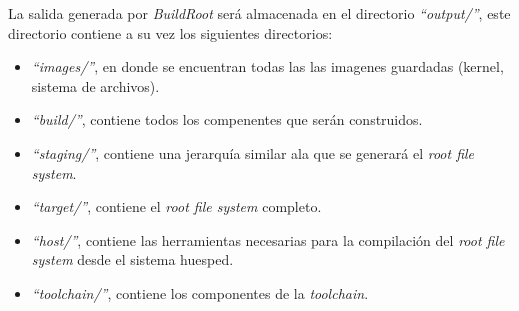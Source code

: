 La salida generada por \emph{BuildRoot} será almacenada en el directorio
\emph{``output/''}, este directorio contiene a su vez los siguientes
directorios:
\begin{itemize}
 \item \emph{``images/''}, en donde se encuentran todas las las imagenes 
guardadas
(kernel, sistema de archivos).
 \item \emph{``build/''}, contiene todos los compenentes que serán construidos.
 \item \emph{``staging/''}, contiene una jerarquía similar  ala que se generará
 el \emph{root file system}.
 \item \emph{``target/''}, contiene el \emph{root file system} completo.
 \item \emph{``host/''}, contiene las herramientas necesarias para la
compilación del \emph{root file system} desde el sistema huesped.
 \item \emph{``toolchain/''}, contiene los componentes de la \emph{toolchain}.
\end{itemize}



